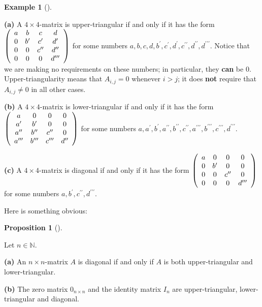 \documentclass[numbers=enddot,12pt,final,onecolumn,notitlepage]{scrartcl}%
\theoremstyle{definition}
\newtheorem{prop}[theo]{Proposition}
\newenvironment{proposition}[1][]
{\begin{prop}[#1]\begin{leftbar}}
{\end{leftbar}\end{prop}}
\newtheorem{exam}[theo]{Example}
\newenvironment{example}[1][]
{\begin{exam}[#1]\begin{leftbar}}
{\end{leftbar}\end{exam}}
\begin{document}
\begin{example}
\label{exam.triangular}\textbf{(a)} A $4\times4$-matrix is upper-triangular if
and only if it has the form $\left(
\begin{array}
[c]{cccc}%
a & b & c & d\\
0 & b^{\prime} & c^{\prime} & d^{\prime}\\
0 & 0 & c^{\prime\prime} & d^{\prime\prime}\\
0 & 0 & 0 & d^{\prime\prime\prime}%
\end{array}
\right)  $ for some numbers $a,b,c,d,b^{\prime},c^{\prime},d^{\prime
},c^{\prime\prime},d^{\prime\prime},d^{\prime\prime\prime}$. Notice that we
are making no requirements on these numbers; in particular, they \textbf{can}
be $0$. Upper-triangularity means that $A_{i,j}=0$ whenever $i>j$; it does
\textbf{not} require that $A_{i,j}\neq0$ in all other cases.

\textbf{(b)} A $4\times4$-matrix is lower-triangular if and only if it has the
form $\left(
\begin{array}
[c]{cccc}%
a & 0 & 0 & 0\\
a^{\prime} & b^{\prime} & 0 & 0\\
a^{\prime\prime} & b^{\prime\prime} & c^{\prime\prime} & 0\\
a^{\prime\prime\prime} & b^{\prime\prime\prime} & c^{\prime\prime\prime} &
d^{\prime\prime}%
\end{array}
\right)  $ for some numbers $a,a^{\prime},b^{\prime},a^{\prime\prime
},b^{\prime\prime},c^{\prime\prime},a^{\prime\prime\prime},b^{\prime
\prime\prime},c^{\prime\prime\prime},d^{\prime\prime\prime}$.

\textbf{(c)} A $4\times4$-matrix is diagonal if and only if it has the form
$\left(
\begin{array}
[c]{cccc}%
a & 0 & 0 & 0\\
0 & b^{\prime} & 0 & 0\\
0 & 0 & c^{\prime\prime} & 0\\
0 & 0 & 0 & d^{\prime\prime\prime}%
\end{array}
\right)  $ for some numbers $a,b^{\prime},c^{\prime\prime},d^{\prime
\prime\prime}$.
\end{example}

Here is something obvious:

\begin{proposition}
\label{prop.triangular.obvious}Let $n\in\mathbb{N}$.

\textbf{(a)} An $n\times n$-matrix $A$ is diagonal if and only if $A$ is both
upper-triangular and lower-triangular.

\textbf{(b)} The zero matrix $0_{n\times n}$ and the identity matrix $I_{n}$
are upper-triangular, lower-triangular and diagonal.
\end{proposition}
\end{document}
